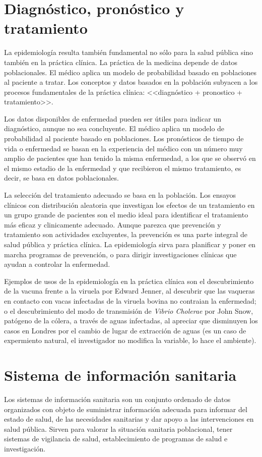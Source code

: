 \section{Diagnóstico, pronóstico y tratamiento}
La epidemiología resulta también fundamental no sólo para la salud pública sino también en la práctica clínica. La práctica de la medicina depende de datos poblacionales. El médico aplica un modelo de probabilidad basado en poblaciones al paciente a tratar. Los conceptos y datos basados en la población subyacen a los procesos fundamentales de la práctica clínica: <<diagnóstico + pronostico + tratamiento>>.

Los datos disponibles de enfermedad pueden ser útiles para indicar un diagnóstico, aunque no sea concluyente. El médico aplica un modelo de probabilidad al paciente basado en poblaciones. Los pronósticos de tiempo de vida o enfermedad se basan en la experiencia del médico con un número muy amplio de pacientes que han tenido la misma enfermedad, a los que se observó en el mismo estadio de la enfermedad y que recibieron el mismo tratamiento, es decir, se basa en datos poblacionales.

La selección del tratamiento adecuado se basa en la población. Los ensayos clínicos con distribución aleatoria que investigan los efectos de un tratamiento en un grupo grande de pacientes son el medio ideal para identificar el tratamiento más eficaz y clinicamente  adecuado. Aunque parezca que prevención y tratamiento son actividades excluyentes, la prevención es una parte integral de salud pública y práctica clínica. La epidemiología sirva para planificar y poner en marcha programas de prevención, o para dirigir investigaciones clínicas que ayudan a controlar la enfermedad.

Ejemplos de usos de la epidemiología en la práctica clínica son el descubrimiento de la vacuna frente a la viruela por Edward Jenner, al descubrir que las vaqueras en contacto con vacas infectadas de la viruela bovina no contraian la enfermedad; o el descubrimiento del modo de transmisión de \textit{Vibrio Cholerae} por John Snow, patógeno de la cólera, a través de aguas infectadas, al apreciar que disminuyen los casos en Londres por el cambio de lugar de extracción de aguas (es un caso de expermiento natural, el investigador no modifica la variable, lo hace el ambiente).
\section{Sistema de información sanitaria}
Los sistemas de información sanitaria son un conjunto ordenado de datos organizados con objeto de suministrar información adecuada para informar del estado de salud, de las necesidades sanitarias y dar apoyo a las intervenciones en salud pública. Sirven para valorar la situación sanitaria poblacional, tener sistemas de vigilancia de salud, establecimiento de programas de salud e investigación.

